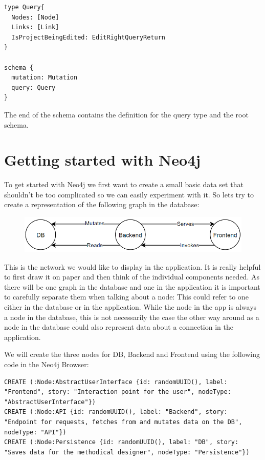 \begin{lstlisting}
type Query{
  Nodes: [Node]
  Links: [Link]
  IsProjectBeingEdited: EditRightQueryReturn
}

schema {
  mutation: Mutation
  query: Query
}
\end{lstlisting}

The end of the schema contains the definition for the query type and the root schema.

\section{Getting started with Neo4j}
To get started with Neo4j we first want to create a small basic data set that shouldn't be too complicated so we can easily experiment with it. So lets try to create a representation of the following graph in the database:

\begin{figure}[H]
\centering
\includegraphics[scale=.8]{Bilder/BasicGraph.png}
\label{ex421}
\end{figure}

This is the network we would like to display in the application. It is really helpful to first draw it on paper and then think of the individual components needed. As there will be one graph in the database and one in the application it is important to carefully separate them when talking about a node: This could refer to one either in the database or in the application. While the node in the app is always a node in the database, this is not necessarily the case the other way around as a node in the database could also represent data about a connection in the application.

We will create the three nodes for DB, Backend and Frontend using the following code in the Neo4j Browser:

\begin{lstlisting}
CREATE (:Node:AbstractUserInterface {id: randomUUID(), label: "Frontend", story: "Interaction point for the user", nodeType: "AbstractUserInterface"})
CREATE (:Node:API {id: randomUUID(), label: "Backend", story: "Endpoint for requests, fetches from and mutates data on the DB", nodeType: "API"})
CREATE (:Node:Persistence {id: randomUUID(), label: "DB", story: "Saves data for the methodical designer", nodeType: "Persistence"})
\end{lstlisting}

